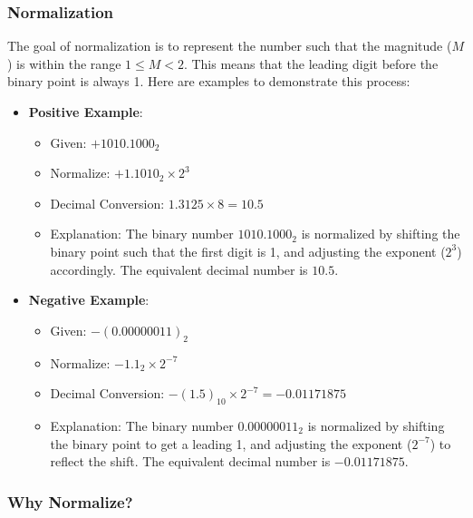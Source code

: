 \documentclass[12pt,openany, tikz,border=10pt]{book}
\begin{document}
			      	
			      	\subsubsection[short]{Normalization}
			      	The goal of normalization is to represent the number such that the magnitude (\(M\)) is within the range \(1 \leq M < 2\). This means that the leading digit before the binary point is always 1. Here are examples to demonstrate this process:
			      	
			      	\begin{itemize}
			      		\item[] \textbf{Positive Example}:
			      		      \begin{itemize}
			      		      	\item[] Given: \( +1010.1000_2 \)
			      		      	\item[] Normalize: \( +1.1010_2 \times 2^3 \)
			      		      	\item[] Decimal Conversion: \( 1.3125 \times 8 = 10.5 \)
			      		      	\item[] Explanation: The binary number \(1010.1000_2\) is normalized by shifting the binary point such that the first digit is 1, and adjusting the exponent (\(2^3\)) accordingly. The equivalent decimal number is \(10.5\).
			      		      \end{itemize}
			      		      \newpage
			      		\item[] \textbf{Negative Example}:
			      		      \begin{itemize}
			      		      	\item[] Given: \( -(0.00000011)_2 \)
			      		      	\item[] Normalize: \( -1.1_2 \times 2^{-7} \)
			      		      	\item[] Decimal Conversion: \( -(1.5)_{10} \times 2^{-7} = -0.01171875 \)
			      		      	\item[] Explanation: The binary number \(0.00000011_2\) is normalized by shifting the binary point to get a leading 1, and adjusting the exponent (\(2^{-7}\)) to reflect the shift. The equivalent decimal number is \(-0.01171875\).
			      		      \end{itemize}
			      	\end{itemize}
			      	    
			      	\subsubsection{Why Normalize?}
			      	    
\end{document}
